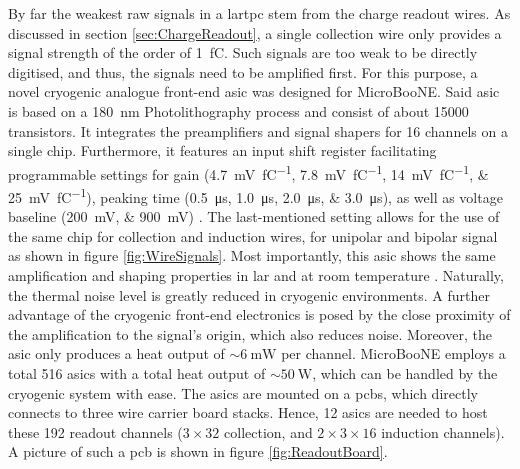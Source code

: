By far the weakest raw signals in a \gls{lartpc} stem from the charge readout wires. As discussed in section \ref{sec:ChargeReadout}, a single collection wire only provides a signal strength of the order of \SI{1}{\femto\coulomb}. Such signals are too weak to be directly digitised, and thus, the signals need to be amplified first. For this purpose, a novel cryogenic analogue front-end \gls{asic} was designed for MicroBooNE. Said \gls{asic} is based on a \SI{180}{\nano\metre} \gls{Photolithography} process and consist of about \num{15000} transistors. It integrates the preamplifiers and signal shapers for \num{16} channels on a single chip. Furthermore, it features an input shift register facilitating programmable settings for gain (\SIlist{4.7;7.8;14;25}{\milli\volt\per\femto\coulomb}), peaking time (\SIlist{0.5;1.0;2.0;3.0}{\micro\second}), as well as voltage baseline (\SIlist{200;900}{\milli\volt}) \cite{LArASIC1}. The last-mentioned setting allows for the use of the same chip for collection and induction wires, \ie for unipolar and bipolar signal as shown in figure \ref{fig:WireSignals}. Most importantly, this \gls{asic} shows the same amplification and shaping properties in \gls{lar} and at room temperature \cite{LArASIC2}. Naturally, the thermal noise level is greatly reduced in cryogenic environments. A further advantage of the cryogenic front-end electronics is posed by the close proximity of the amplification to the signal's origin, which also reduces noise. Moreover, the \gls{asic} only produces a heat output of $\sim\SI{6}{\milli\watt}$ per channel. MicroBooNE employs a total \num{516} \glspl{asic} with a total heat output of $\sim\SI{50}{\watt}$, which can be handled by the cryogenic system with ease. The \glspl{asic} are mounted on a \glspl{pcb}, which directly connects to three wire carrier board stacks. Hence, \num{12} \glspl{asic} are needed to host these \num{192} readout channels ($\num{3}\times\num{32}$ collection, and $\num{2}\times\num{3}\times\num{16}$ induction channels). A picture of such a \gls{pcb} is shown in figure \ref{fig:ReadoutBoard}.
